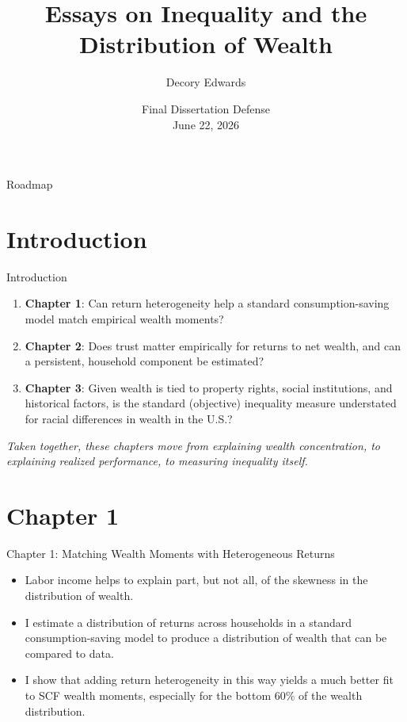 \documentclass{beamer}
\title[Dissertation Defense]{Essays on Inequality and the Distribution of Wealth}
\author[Edwards]{Decory Edwards}
\institute[JHU]{Johns Hopkins University}
\date[June 22, 2026]{Final Dissertation Defense \\ June 22, 2026}
\begin{document}
\begin{frame}
  \titlepage
\end{frame}

\begin{frame}{Roadmap}
  \tableofcontents[hideallsubsections]
\end{frame}

\section{Introduction}

\begin{frame}{Introduction}
  \begin{enumerate}
    \item \textbf{Chapter 1}: Can return heterogeneity help a standard consumption-saving model match empirical wealth moments?
    \item \textbf{Chapter 2}: Does trust matter empirically for returns to net wealth, and can a persistent, household component be estimated?
    \item \textbf{Chapter 3}: Given wealth is tied to property rights, social institutions, and historical factors, is the standard (objective) inequality measure understated for racial differences in wealth in the U.S.?
  \end{enumerate}

  \vspace{0.6em}
  \textit{Taken together, these chapters move from explaining wealth concentration, to explaining realized performance, to measuring inequality itself.}
\end{frame}

\section{Chapter 1}

\begin{frame}{Chapter 1: Matching Wealth Moments with Heterogeneous Returns}
  \begin{itemize}
    \item Labor income helps to explain part, but not all, of the skewness in the distribution of wealth.
    \item I estimate a distribution of returns across households in a standard consumption-saving model to produce a distribution of wealth that can be compared to data.
    \item I show that adding return heterogeneity in this way yields a much better fit to SCF wealth moments, especially for the bottom 60\% of the wealth distribution.
  \end{itemize}

  \vspace{0.6em}
\end{frame}
\end{document}
